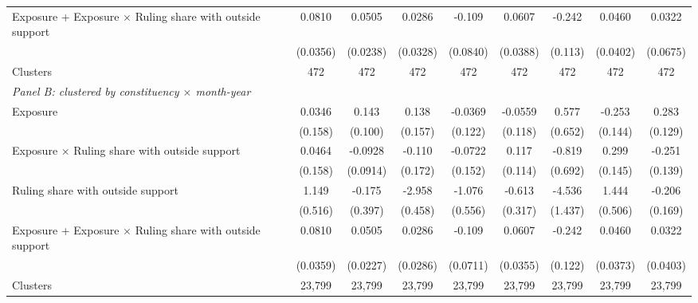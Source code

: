 {\begin{tabular}{l*{8}{c}}
Exposure + Exposure $\times$ Ruling share with outside support&0.0810\sym{**}         &0.0505\sym{**}         &      0.0286         &      -0.109         &      0.0607         &-0.242\sym{**}         &      0.0460         &      0.0322         \\
            &    (0.0356)         &    (0.0238)         &    (0.0328)         &    (0.0840)         &    (0.0388)         &     (0.113)         &    (0.0402)         &    (0.0675)         \\
Clusters    &         472         &         472         &         472         &         472         &         472         &         472         &         472         &         472         \\
\midrule

\multicolumn{9}{l}{\textit{Panel B: clustered by constituency $\times$ month-year}} \\
Exposure    &      0.0346         &       0.143         &       0.138         &     -0.0369         &     -0.0559         &       0.577         &      -0.253\sym{*}  &       0.283\sym{**} \\
            &     (0.158)         &     (0.100)         &     (0.157)         &     (0.122)         &     (0.118)         &     (0.652)         &     (0.144)         &     (0.129)         \\
Exposure $\times$ Ruling share with outside support&      0.0464         &     -0.0928         &      -0.110         &     -0.0722         &       0.117         &      -0.819         &       0.299\sym{**} &      -0.251\sym{*}  \\
            &     (0.158)         &    (0.0914)         &     (0.172)         &     (0.152)         &     (0.114)         &     (0.692)         &     (0.145)         &     (0.139)         \\
Ruling share with outside support&       1.149\sym{**} &      -0.175         &      -2.958\sym{***}&      -1.076\sym{*}  &      -0.613\sym{*}  &      -4.536\sym{***}&       1.444\sym{***}&      -0.206         \\
            &     (0.516)         &     (0.397)         &     (0.458)         &     (0.556)         &     (0.317)         &     (1.437)         &     (0.506)         &     (0.169)         \\

Exposure + Exposure $\times$ Ruling share with outside support&0.0810\sym{**}         &0.0505\sym{**}         &      0.0286         &      -0.109         &0.0607\sym{*}         &-0.242\sym{**}         &      0.0460         &      0.0322         \\
            &    (0.0359)         &    (0.0227)         &    (0.0286)         &    (0.0711)         &    (0.0355)         &     (0.122)         &    (0.0373)         &    (0.0403)         \\
Clusters    &      23,799         &      23,799         &      23,799         &      23,799         &      23,799         &      23,799         &      23,799         &      23,799         \\
\midrule


\end{tabular}}
